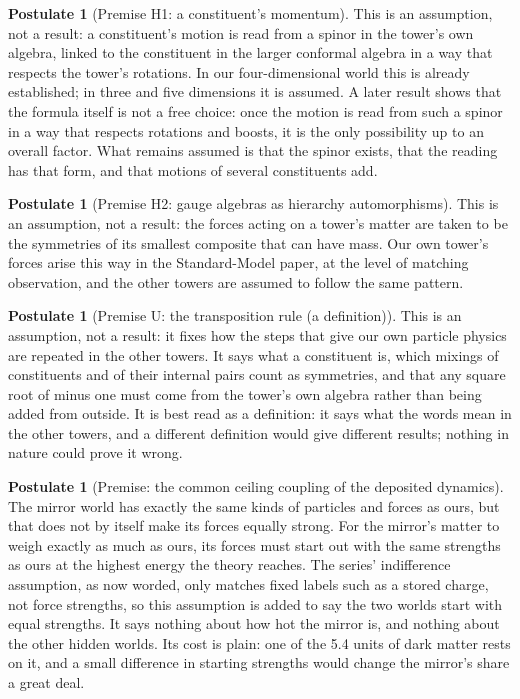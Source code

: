 \documentclass[11pt]{article}
\theoremstyle{definition}
\newtheorem{postulate}[theorem]{Postulate}
\theoremstyle{plain}
\begin{document}
\begin{postulate}[Premise H1: a constituent's momentum]\label{c:dark-tower-matter.h1-momentum}
This is an assumption, not a result: a constituent's motion is read from a spinor in the tower's own algebra, linked to the constituent in the larger conformal algebra in a way that respects the tower's rotations. In our four-dimensional world this is already established; in three and five dimensions it is assumed. A later result shows that the formula itself is not a free choice: once the motion is read from such a spinor in a way that respects rotations and boosts, it is the only possibility up to an overall factor. What remains assumed is that the spinor exists, that the reading has that form, and that motions of several constituents add.
\end{postulate}

\begin{postulate}[Premise H2: gauge algebras as hierarchy automorphisms]\label{c:dark-tower-matter.h2-identification}
This is an assumption, not a result: the forces acting on a tower's matter are taken to be the symmetries of its smallest composite that can have mass. Our own tower's forces arise this way in the Standard-Model paper, at the level of matching observation, and the other towers are assumed to follow the same pattern.
\end{postulate}

\begin{postulate}[Premise U: the transposition rule (a definition)]\label{c:dark-tower-matter.u-transposition-rule}
This is an assumption, not a result: it fixes how the steps that give our own particle physics are repeated in the other towers. It says what a constituent is, which mixings of constituents and of their internal pairs count as symmetries, and that any square root of minus one must come from the tower's own algebra rather than being added from outside. It is best read as a definition: it says what the words mean in the other towers, and a different definition would give different results; nothing in nature could prove it wrong.
\end{postulate}

\begin{postulate}[Premise: the common ceiling coupling of the deposited dynamics]\label{c:synthesis.common-ceiling-coupling-premise}
The mirror world has exactly the same kinds of particles and forces as ours, but that does not by itself make its forces equally strong. For the mirror's matter to weigh exactly as much as ours, its forces must start out with the same strengths as ours at the highest energy the theory reaches. The series' indifference assumption, as now worded, only matches fixed labels such as a stored charge, not force strengths, so this assumption is added to say the two worlds start with equal strengths. It says nothing about how hot the mirror is, and nothing about the other hidden worlds. Its cost is plain: one of the 5.4 units of dark matter rests on it, and a small difference in starting strengths would change the mirror's share a great deal.
\end{postulate}
\end{document}
